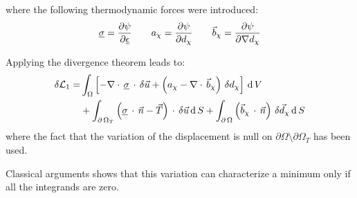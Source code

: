 where the following thermodynamic forces were introduced:
\begin{equation}
  \label{eq:ef_micromorphic:formulation:thermodynamic_forces}
  \begin{aligned}
    \underline{\sigma}  = \displaystyle \frac{\displaystyle \partial \psi}{\displaystyle \partial \underline{\epsilon}} \quad\quad
    a_{\chi} = \displaystyle \frac{\displaystyle \partial \psi}{\displaystyle \partial d_{\chi}} \quad\quad
    \vec{b}_{\chi} = \displaystyle \frac{\displaystyle \partial \psi}{\displaystyle \partial \nabla d_{\chi}}
  \end{aligned}
\end{equation}

Applying the divergence theorem leads to:
\begin{equation}
  \label{eq:ef_micromorphic:formulation:lagrangian_variation_2}
  \begin{aligned}
    \delta \mathcal{L}_{1}
    =
    &
    \int_{\Omega}
    \left[
      -\nabla \cdot\,\underline{\sigma}\,\cdot\,\delta \vec{u}+
      \left(a_{\chi}-\nabla \cdot\,\vec{b}_{\chi}\right)\,\delta d_{\chi}
    \right]
    \,\mathrm{d}\,V
    \\
    & +
    \int_{\partial\,\Omega_{T}} \left(\underline{\sigma}\,\cdot\,\vec{n}
    -
    \vec{T}\right)\,\cdot\,\delta \vec{u} \,\mathrm{d}\,S
    +
    \int_{\partial\,\Omega} \left(\vec{b}_{\chi}\,\cdot\,\vec{n}\right)\,\delta \vec{d}_{\chi} \,\mathrm{d}\,S
  \end{aligned}
\end{equation}
where the fact that the variation of the
displacement is null on \(\partial\Omega\setminus\partial\Omega_{T}\)
has been used.

Classical arguments shows that this variation can characterize a
minimum only if all the integrands are zero.

